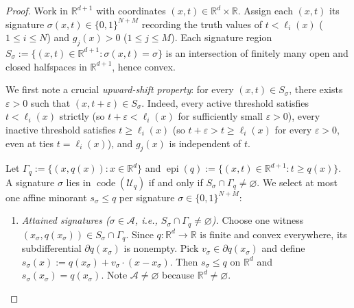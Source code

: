 \documentclass[11pt]{article}
\theoremstyle{plain}
\theoremstyle{definition}
\theoremstyle{remark}
\DeclareMathOperator{\code}{code}
\DeclareMathOperator{\epi}{epi}
\begin{document}
\begin{proof}
Work in $\mathbb{R}^{d+1}$ with coordinates $(x, t) \in \mathbb{R}^d \times \mathbb{R}$. Assign each $(x, t)$ its signature $\sigma(x, t) \in \{0, 1\}^{N+M}$ recording the truth values of $t < \ell_i(x)$ ($1 \le i \le N$) and $g_j(x) > 0$ ($1 \le j \le M$). Each signature region $S_\sigma := \{(x, t) \in \mathbb{R}^{d+1} : \sigma(x, t) = \sigma\}$ is an intersection of finitely many open and closed halfspaces in $\mathbb{R}^{d+1}$, hence convex.

We first note a crucial \emph{upward-shift property}: for every $(x, t) \in S_\sigma$, there exists $\varepsilon > 0$ such that $(x, t + \varepsilon) \in S_\sigma$. Indeed, every active threshold satisfies $t < \ell_i(x)$ strictly (so $t + \varepsilon < \ell_i(x)$ for sufficiently small $\varepsilon > 0$), every inactive threshold satisfies $t \ge \ell_i(x)$ (so $t + \varepsilon > t \ge \ell_i(x)$ for every $\varepsilon > 0$, even at ties $t = \ell_i(x)$), and $g_j(x)$ is independent of $t$.

Let $\Gamma_q := \{(x, q(x)) : x \in \mathbb{R}^d\}$ and $\epi(q) := \{(x, t) \in \mathbb{R}^{d+1} : t \ge q(x)\}$. A signature $\sigma$ lies in $\code(\mathcal{U}_q)$ if and only if $S_\sigma \cap \Gamma_q \neq \varnothing$. We select at most one affine minorant $s_\sigma \le q$ per signature $\sigma \in \{0, 1\}^{N+M}$:
\begin{enumerate}[label=\textup{(\arabic*)}]
\item \emph{Attained signatures ($\sigma \in \mathcal{A}$, i.e., $S_\sigma \cap \Gamma_q \neq \varnothing$).} Choose one witness $(x_\sigma, q(x_\sigma)) \in S_\sigma \cap \Gamma_q$. Since $q : \mathbb{R}^d \to \mathbb{R}$ is finite and convex everywhere, its subdifferential $\partial q(x_\sigma)$ is nonempty. Pick $v_\sigma \in \partial q(x_\sigma)$ and define $s_\sigma(x) := q(x_\sigma) + v_\sigma \cdot (x - x_\sigma)$. Then $s_\sigma \le q$ on $\mathbb{R}^d$ and $s_\sigma(x_\sigma) = q(x_\sigma)$. Note $\mathcal{A} \neq \varnothing$ because $\mathbb{R}^d \neq \varnothing$.


\end{enumerate}
\end{proof}
\end{document}
